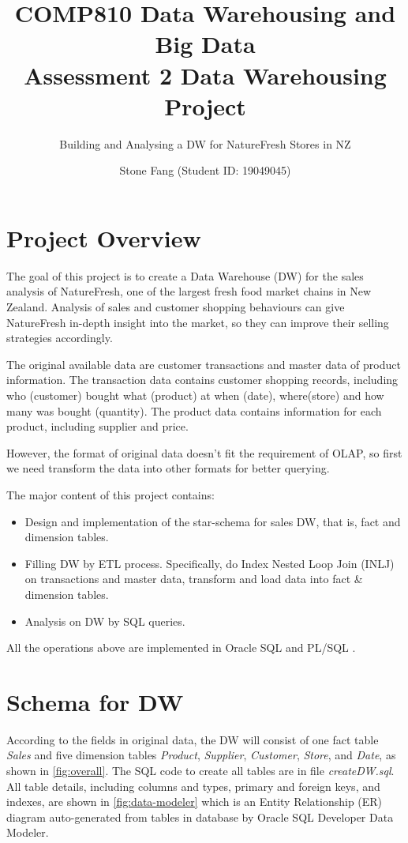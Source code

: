 \documentclass[
  a4paper,
]{article}
\title{    \textbf{COMP810 Data Warehousing and Big Data \\
    Assessment 2 Data Warehousing Project}}
\subtitle{Building and Analysing a DW for NatureFresh Stores in NZ}
\author{Stone Fang (Student ID: 19049045)}
\date{}
\providecommand{\tightlist}{%
  \setlength{\itemsep}{0pt}\setlength{\parskip}{0pt}}
\begin{document}
\maketitle

\hypertarget{project-overview}{%
\section{Project Overview}\label{project-overview}}

The goal of this project is to create a Data Warehouse (DW) for the
sales analysis of NatureFresh, one of the largest fresh food market
chains in New Zealand. Analysis of sales and customer shopping
behaviours can give NatureFresh in-depth insight into the market, so
they can improve their selling strategies accordingly.

The original available data are customer transactions and master data of
product information. The transaction data contains customer shopping
records, including who (customer) bought what (product) at when (date),
where(store) and how many was bought (quantity). The product data
contains information for each product, including supplier and price.

However, the format of original data doesn't fit the requirement of
OLAP, so first we need transform the data into other formats for better
querying.

The major content of this project contains:

\begin{itemize}
\tightlist
\item
  Design and implementation of the star-schema for sales DW, that is,
  fact and dimension tables.
\item
  Filling DW by ETL process. Specifically, do Index Nested Loop Join
  (INLJ) on transactions and master data, transform and load data into
  fact \& dimension tables.
\item
  Analysis on DW by SQL queries.
\end{itemize}

All the operations above are implemented in Oracle SQL
\autocite{oracle_database_nodate} and PL/SQL
\autocite{oracle_plsql_nodate}.

\hypertarget{schema-for-dw}{%
\section{Schema for DW}\label{schema-for-dw}}

According to the fields in original data, the DW will consist of one
fact table \emph{Sales} and five dimension tables \emph{Product},
\emph{Supplier}, \emph{Customer}, \emph{Store}, and \emph{Date}, as
shown in \cref{fig:overall}. The SQL code to create all tables are in
file \emph{createDW.sql}. All table details, including columns and
types, primary and foreign keys, and indexes, are shown in
\cref{fig:data-modeler} which is an Entity Relationship (ER) diagram
auto-generated from tables in database by Oracle SQL Developer Data
Modeler.
\end{document}
